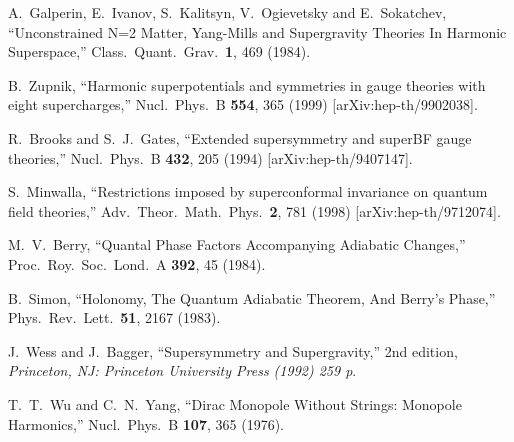 \documentclass[a4paper,12pt, amsfonts, amssymb]{article}
\begin{document}
\begin{thebibliography}{99}
 A.~Galperin, E.~Ivanov, S.~Kalitsyn, V.~Ogievetsky and E.~Sokatchev,
``Unconstrained N=2 Matter, Yang-Mills and Supergravity Theories In Harmonic Superspace,''
Class.\ Quant.\ Grav.\  {\bf 1}, 469 (1984).

 B.~Zupnik, ``Harmonic superpotentials and symmetries in gauge theories with eight  supercharges,''
Nucl.\ Phys.\ B {\bf 554}, 365 (1999) [arXiv:hep-th/9902038].


R.~Brooks and S.~J.~Gates,
``Extended supersymmetry and superBF gauge theories,''
Nucl.\ Phys.\ B {\bf 432}, 205 (1994)
[arXiv:hep-th/9407147].

S.~Minwalla, ``Restrictions imposed by superconformal invariance on quantum field  theories,'' Adv.\ Theor.\ Math.\ Phys.\  {\bf 2}, 781 (1998)
[arXiv:hep-th/9712074].

M.~V.~Berry, ``Quantal Phase Factors Accompanying Adiabatic Changes,''
Proc.\ Roy.\ Soc.\ Lond.\ A {\bf 392}, 45 (1984).

B.~Simon, ``Holonomy, The Quantum Adiabatic Theorem, And Berry's Phase,''
Phys.\ Rev.\ Lett.\  {\bf 51}, 2167 (1983).

J.~Wess and J.~Bagger, ``Supersymmetry and Supergravity,'' 2nd edition,
{\it Princeton, NJ: Princeton University Press (1992) 259 p}.

T.~T.~Wu and C.~N.~Yang, ``Dirac Monopole Without Strings: Monopole
Harmonics,'' Nucl.\ Phys.\ B {\bf 107}, 365 (1976).

\end{thebibliography}
\end{document}
